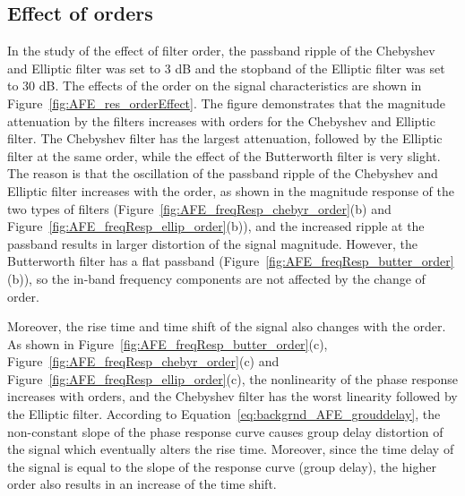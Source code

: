 \subsection{Effect of orders}
In the study of the effect of filter order, the passband ripple of the Chebyshev and Elliptic filter was set to 3 dB and the stopband of the Elliptic filter was set to 30 dB. The effects of the order on the signal characteristics are shown in Figure~\ref{fig:AFE_res_orderEffect}. The figure demonstrates that the magnitude attenuation by the filters increases with orders for the Chebyshev and Elliptic filter. The Chebyshev filter has the largest attenuation, followed by the Elliptic filter at the same order, while the effect of the Butterworth filter is very slight. The reason is that the oscillation of the passband ripple of the Chebyshev and Elliptic filter increases with the order, as shown in the magnitude response of the two types of filters (Figure~\ref{fig:AFE_freqResp_chebyr_order}(b) and Figure~\ref{fig:AFE_freqResp_ellip_order}(b)), and the increased ripple at the passband results in larger distortion of the signal magnitude. However, the Butterworth filter has a flat passband (Figure~\ref{fig:AFE_freqResp_butter_order}(b)), so the in-band frequency components are not affected by the change of order.\par
Moreover, the rise time and time shift of the signal also changes with the order. As shown in Figure~\ref{fig:AFE_freqResp_butter_order}(c), Figure~\ref{fig:AFE_freqResp_chebyr_order}(c) and Figure~\ref{fig:AFE_freqResp_ellip_order}(c), the nonlinearity of the phase response increases with orders, and the Chebyshev filter has the worst linearity followed by the Elliptic filter. According to Equation~\eqref{eq:backgrnd_AFE_grouddelay}, the non-constant slope of the phase response curve causes group delay distortion of the signal which eventually alters the rise time. Moreover, since the time delay of the signal is equal to the slope of the response curve (group delay), the higher order also results in an increase of the time shift. 

